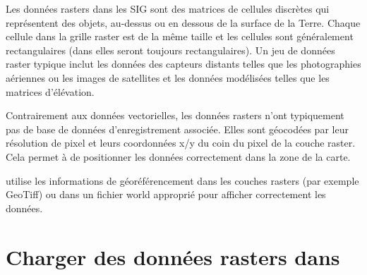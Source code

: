 Les données rasters dans les SIG sont des matrices de cellules discrètes qui
représentent des objets, au-dessus ou en dessous de la surface de la Terre.
Chaque cellule dans la grille raster est de la même taille et les cellules sont
généralement rectangulaires (dans \qg elles seront toujours rectangulaires).
Un jeu de données raster typique inclut les données des capteurs distants
telles que les photographies aériennes ou les images de satellites et les
données modélisées telles que les matrices d'élévation.

Contrairement aux données vectorielles, les données rasters n'ont typiquement pas de
base de données d'enregistrement associée. Elles sont géocodées par leur
résolution de pixel et leurs coordonnées x/y du coin du pixel de la couche
raster. Cela permet à \qg de positionner les données correctement dans la zone
de la carte.

\qg utilise les informations de géoréférencement dans les couches rasters (par
exemple GeoTiff) ou dans un fichier world approprié pour afficher correctement
les données.

\section{Charger des données rasters dans \qg}\label{label_loadraster}

